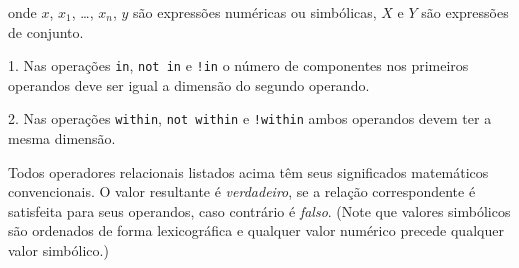 \documentclass[11pt, brazil]{report}
\begin{document}

\noindent onde $x$, $x_1$, \dots, $x_n$, $y$ são expressões numéricas ou
simbólicas, $X$ e $Y$ são expressões de conjunto.


\newpage

1. Nas operações {\tt in}, {\tt not in} e {\tt !in} o número
de componentes nos primeiros operandos deve ser igual a
dimensão do segundo operando.

2. Nas operações {\tt within}, {\tt not within} e {\tt !within}
ambos operandos devem ter a mesma dimensão.

Todos operadores relacionais listados acima têm seus significados
matemáticos convencionais. O valor resultante é {\it verdadeiro}, se
a relação correspondente é satisfeita para seus operandos, caso contrário
é {\it falso}. (Note que valores simbólicos são ordenados de forma
lexicográfica e qualquer valor numérico precede qualquer valor simbólico.)

%
%
\end{document}
